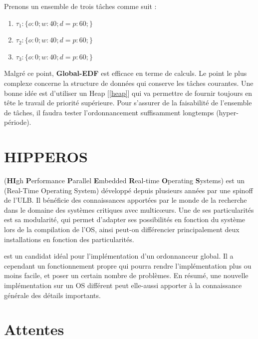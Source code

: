 	Prenons un ensemble de trois tâches comme suit :

	\begin{enumerate}
		\setlength\itemsep{0.1em}
		\item $\tau_1 : \{o:0; w:40; d=p:60;\}$
		\item $\tau_2 : \{o:0; w:40; d=p:60;\}$
		\item $\tau_3 : \{o:0; w:40; d=p:60;\}$
	\end{enumerate}
	
	
	Malgré ce point, \textbf{Global-EDF} est \og{}efficace\fg{} en terme de calculs.
	Le point le plus complexe concerne la structure de données qui conserve les 
	tâches courantes. Une bonne idée est d'utiliser un Heap [\ref*{heap}] qui 
	va permettre de fournir toujours en tête le travail de priorité supérieure.
	Pour s'assurer de la faisabilité de l'ensemble de tâches, 
	il faudra tester l'ordonnancement suffisamment longtemps (hyper-période).\newline

		
\section{HIPPEROS}
	 (\textbf{HI}gh \textbf{P}erformance \textbf{P}arallel \textbf{E}mbedded \textbf{R}eal-time \textbf{O}perating \textbf{S}ystems)
	est un  (Real-Time Operating System) développé depuis plusieurs années par une spinoff de l'ULB.
	Il bénéficie des connaissances apportées par le monde de la recherche dans 
	le domaine des systèmes critiques avec multic\oe{}urs. Une de ses particularités 
	est sa modularité, qui permet d'adapter ses possibilités en fonction du système 
	lors de la compilation de l'OS, ainsi peut-on différencier principalement 
	deux installations en fonction des particularités. 
	
	 est un candidat idéal pour l'implémentation d'un ordonnanceur 
	global. Il a cependant un fonctionnement propre qui pourra rendre l'implémentation 
	plus ou moins facile, et poser un certain nombre de problèmes. 
	En résumé, une nouvelle implémentation sur un OS différent 
	peut elle-aussi apporter à la connaissance générale des détails importants.
		
\section{Attentes}

